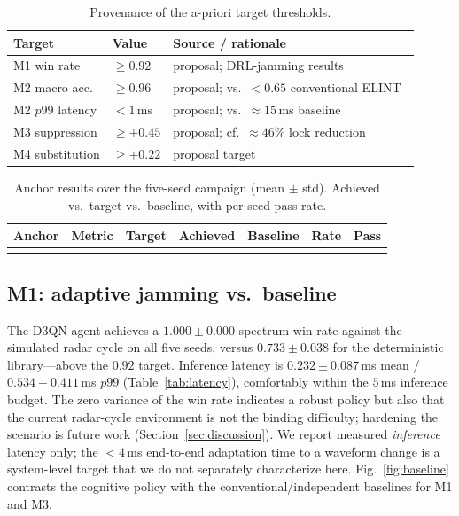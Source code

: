 \documentclass[journal]{IEEEtran}
\begin{document}
\begin{table}[t]
\caption{Provenance of the a-priori target thresholds.}
\label{tab:targets}
\centering
\footnotesize
\begin{tabular}{@{}llp{3.4cm}@{}}
\toprule
Target & Value & Source / rationale \\
\midrule
M1 win rate & $\ge 0.92$ & proposal; DRL-jamming results~\cite{zhao2022sac,wang2022d3qn} \\
M2 macro acc. & $\ge 0.96$ & proposal; vs.\ $<0.65$ conventional ELINT~\cite{matuszewski2021cnn} \\
M2 $p99$ latency & $<1$\,ms & proposal; vs.\ $\approx 15$\,ms baseline~\cite{matuszewski2021cnn} \\
M3 suppression & $\ge +0.45$ & proposal; cf.\ $\approx 46\%$ lock reduction~\cite{cai2025macjd} \\
M4 substitution & $\ge +0.22$ & proposal target \\
\bottomrule
\end{tabular}
\end{table}

\begin{table}[t]
\caption{Anchor results over the five-seed campaign (mean $\pm$ std). Achieved vs.\ target vs.\
baseline, with per-seed pass rate.}
\label{tab:anchors}
\centering
\footnotesize
\begin{tabular}{@{}llccccc@{}}
\toprule
Anchor & Metric & Target & Achieved & Baseline & Rate & Pass \\
\midrule
\\
\bottomrule
\end{tabular}
\end{table}

\subsection{M1: adaptive jamming vs.\ baseline}
The D3QN agent achieves a $1.000 \pm 0.000$ spectrum win rate against the simulated radar cycle
on all five seeds, versus $0.733 \pm 0.038$ for the deterministic library---above the $0.92$
target. Inference latency is $0.232 \pm 0.087$\,ms mean / $0.534 \pm 0.411$\,ms $p99$
(Table~\ref{tab:latency}), comfortably within the $5$\,ms inference budget. The zero variance of
the win rate indicates a robust policy but also that the current radar-cycle environment is not
the binding difficulty; hardening the scenario is future work (Section~\ref{sec:discussion}). We
report measured \emph{inference} latency only; the $<4$\,ms end-to-end adaptation time to a
waveform change is a system-level target that we do not separately characterize here.
Fig.~\ref{fig:baseline} contrasts the cognitive policy with the conventional/independent
baselines for M1 and M3.
\end{document}
